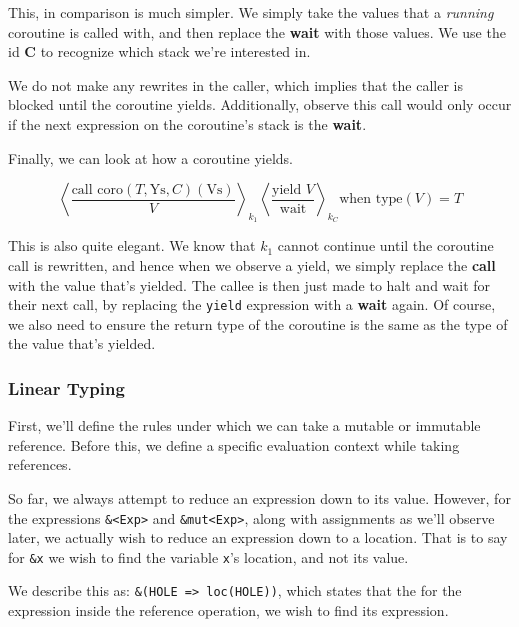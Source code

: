 \documentclass[review,twocolumn]{sigplanconf}
\begin{document}
This, in comparison is much simpler. We simply take the values that a \textit{running} coroutine is called with, and then replace the \textbf{wait} with those values. We use the id \textbf{C} to recognize which stack we're interested in.

We do not make any rewrites in the caller, which implies that the caller is blocked until the coroutine yields. Additionally, observe this call would only occur if the next expression on the coroutine's stack is the \textbf{wait}.

Finally, we can look at how a coroutine yields.

\begin{small}
  \[
    \left\langle
    \frac{ \text{call coro}(T, \text{Ys}, C)(\text{Vs}) }{ V }
    \right\rangle _{k_1}
    \left\langle
    \frac{ \text{yield } V }{ \text{wait} }
    \right\rangle _{k_{C}}
    \text{when type} (V) = T
  \]
\end{small}

This is also quite elegant. We know that $k_1$ cannot continue until the coroutine call is rewritten, and hence when we observe a yield, we simply replace the \textbf{call} with the value that's yielded. The callee is then just made to halt and wait for their next call, by replacing the \verb!yield! expression with a \textbf{wait} again. Of course, we also need to ensure the return type of the coroutine is the same as the type of the value that's yielded.

\subsubsection*{Linear Typing}

First, we'll define the rules under which we can take a mutable or immutable reference. Before this, we define a specific evaluation context while taking references.

So far, we always attempt to reduce an expression down to its value. However, for the expressions \verb!&<Exp>! and \verb!&mut<Exp>!, along with assignments as we'll observe later, we actually wish to reduce an expression down to a location. That is to say for \verb!&x! we wish to find the variable \verb!x!'s location, and not its value.

We describe this as: \verb!&(HOLE => loc(HOLE))!, which states that the for the expression inside the reference operation, we wish to find its expression.
\end{document}
